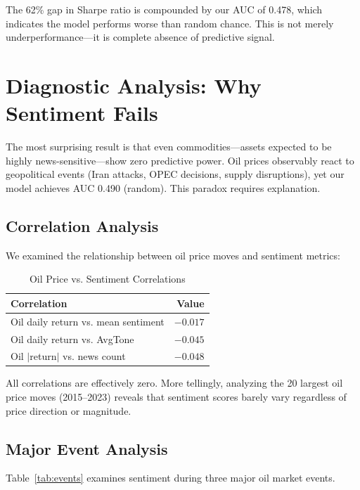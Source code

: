 \documentclass[11pt]{article}
\begin{document}
The 62\% gap in Sharpe ratio is compounded by our AUC of 0.478, which indicates the model performs worse than random chance. This is not merely underperformance---it is complete absence of predictive signal.

\section{Diagnostic Analysis: Why Sentiment Fails}

The most surprising result is that even commodities---assets expected to be highly news-sensitive---show zero predictive power. Oil prices observably react to geopolitical events (Iran attacks, OPEC decisions, supply disruptions), yet our model achieves AUC 0.490 (random). This paradox requires explanation.

\subsection{Correlation Analysis}

We examined the relationship between oil price moves and sentiment metrics:

\begin{table}[h]
\centering
\caption{Oil Price vs. Sentiment Correlations}
\label{tab:corr}
\begin{tabular}{lr}
\toprule
\textbf{Correlation} & \textbf{Value} \\
\midrule
Oil daily return vs. mean sentiment & $-0.017$ \\
Oil daily return vs. AvgTone & $-0.045$ \\
Oil $|$return$|$ vs. news count & $-0.048$ \\
\bottomrule
\end{tabular}
\end{table}

All correlations are effectively zero. More tellingly, analyzing the 20 largest oil price moves (2015--2023) reveals that sentiment scores barely vary regardless of price direction or magnitude.

\subsection{Major Event Analysis}

Table~\ref{tab:events} examines sentiment during three major oil market events.
\end{document}

